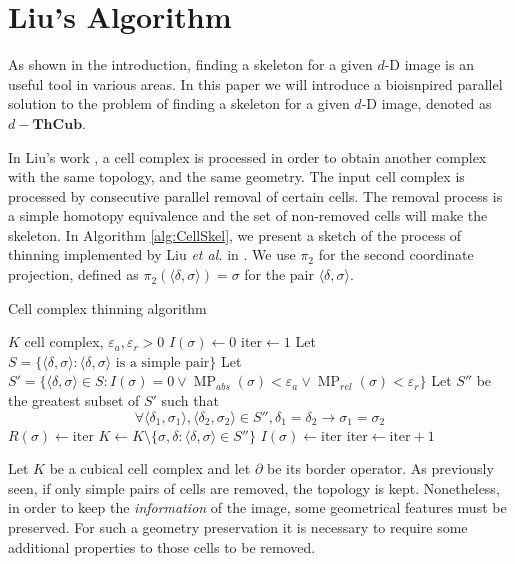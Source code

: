 \documentclass[journal]{IEEEtran}
\DeclareMathOperator{\MP}{MP}
\begin{document}
\section{Liu's Algorithm} \label{sec:Liu}
As shown in the introduction, finding a skeleton for a given $d$-D image is an 
useful tool in various areas. In this paper we will introduce a bioisnpired 
parallel solution to the problem of finding a skeleton for a given $d$-D image, 
denoted as $d-\mathbf{ThCub}$.

In Liu's work \cite{liu20093d}, a cell complex is processed in order to obtain
another complex with the same topology, and the same geometry. The input cell
complex is processed by consecutive parallel removal of certain cells. The
removal process is a simple homotopy equivalence and the set of non-removed cells will make the skeleton. In Algorithm \ref{alg:CellSkel}, we present a sketch of the process of thinning implemented by Liu \emph{et al.} in \cite{liu20093d}. We use $\pi_2$ for the second coordinate projection, defined as $\pi_2(\langle \delta, \sigma \rangle) = \sigma$ for the pair $\langle \delta, \sigma \rangle$.
\begin{algorithm}[t]
 \caption{Cell complex thinning algorithm} \label{alg: Cell thinning}
 \label{alg:CellSkel}
 \begin{algorithmic}
 \REQUIRE $K$ cell complex, $\varepsilon_a, \varepsilon_r > 0$
 \STATE $I(\sigma) \leftarrow 0$
 \ENDFOR
 \STATE $\mbox{iter} \leftarrow 1$
 \REPEAT
 \STATE Let $S = \{\langle \delta, \sigma \rangle: \langle \delta, \sigma
 \rangle \mbox{ is a simple pair}\}$
 \STATE Let $S' =\{\langle \delta, \sigma \rangle \in S:I(\sigma)=0 \vee
 \MP_{abs}(\sigma) < \varepsilon_a \vee \MP_{rel}(\sigma) < \varepsilon_r\}$
 \STATE Let $S''$ be the greatest subset of $S'$ such that $$\forall \langle \delta_1, \sigma_1 \rangle, \langle \delta_2, \sigma_2 \rangle \in S'', \delta_1 = \delta_2 \rightarrow \sigma_1 = \sigma_2$$
 \STATE $R(\sigma) \leftarrow \mbox{iter}$
 \ENDFOR
 \STATE $K \leftarrow K \setminus \{\sigma, \delta: \langle \delta, \sigma \rangle \in S''\}$
 \STATE $I(\sigma) \leftarrow \mbox{iter}$
 \ENDFOR
 \STATE $\mbox{iter} \leftarrow \mbox{iter} + 1$
 \end{algorithmic}
\end{algorithm}

Let $K$ be a cubical cell complex and let $\partial$ be its border
operator. As previously seen, if only simple pairs of cells are removed, the
topology is kept. Nonetheless, in order to keep the {\it information} of the
image, some geometrical features must be preserved. For such a geometry
preservation it is necessary to require some additional properties to those
cells to be removed.
\end{document}
